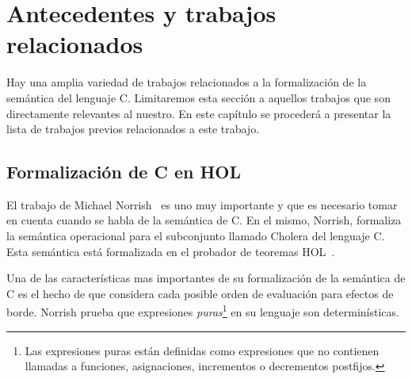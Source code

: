 \chapter{Antecedentes y trabajos relacionados}\label{chapter:previous}


Hay una amplia variedad de trabajos relacionados a la formalización de la semántica del lenguaje C.
Limitaremos esta sección a aquellos trabajos que son directamente relevantes al nuestro.
En este capítulo se procederá a presentar la lista de trabajos previos relacionados a este trabajo.

\begin{comment}
Primero, se hablará de la formalización de C en HOL de Michael Norrish~\citeyearpar{norrish}.
Este trabajo está relacionado al presente porque formaliza la semántica de un subconjunto de C utilizando HOL y el subconjunto de C para el cual se formaliza la semántica es mas grande que el presentado en este trabajo.

Luego, se discutirá el modelo de memoria utilizado en la verificación formal del compilador CompCert~\citep{leroy-blazy-memory-model}
En el presente trabajo se adopta el modelo de memoria utilizado por el compilador verificado de C del proyecto CompCert.

Finalmente, se mencionará el proyecto Autocorres~\citeyearpar{autocorres}, el cual tiene como fin el abstraer la semántica de bajo nivel de C a una representación de más alto nivel.
Este proyecto traduce código de lenguaje C a la lógica de un probador de teoremas con el fin de poder probar propiedades del código fuente en C.
\end{comment}

\section{Formalización de C en HOL}

El trabajo de Michael Norrish~\citeyearpar{norrish} es uno muy importante y que es necesario tomar en cuenta cuando se habla de la semántica de C.
En el mismo, Norrish, formaliza la semántica operacional para el subconjunto llamado Cholera del lenguaje C.
Esta semántica está formalizada en el probador de teoremas HOL~\citep{hol-doc}.

Una de las características mas importantes de su formalización de la semántica de C es el hecho de que considera cada posible orden de evaluación para efectos de borde.
Norrish prueba que expresiones \textit{puras}\footnote{Las expresiones puras están definidas como expresiones que no contienen llamadas a funciones, asignaciones, incrementos o decrementos postfijos.} en su lenguaje son determinísticas.

